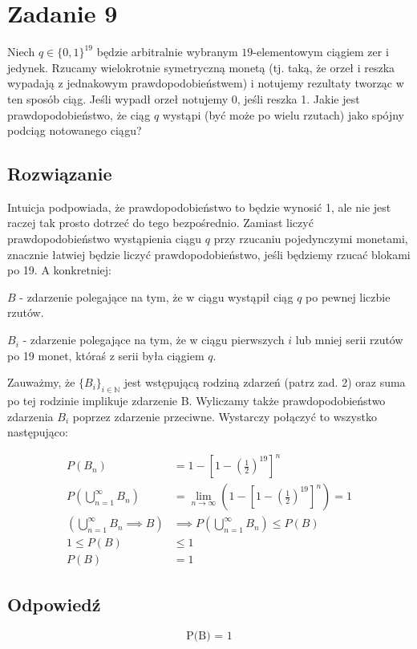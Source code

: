 \section{Zadanie 9}
Niech \(q \in \{0, 1\}^{19}\) będzie arbitralnie wybranym \(19\)-elementowym ciągiem zer i jedynek. Rzucamy wielokrotnie symetryczną monetą (tj. taką, że orzeł i reszka wypadają z jednakowym prawdopodobieństwem) i notujemy rezultaty tworząc w ten sposób ciąg. Jeśli wypadł orzeł notujemy 0, jeśli reszka 1. Jakie jest prawdopodobieństwo, że ciąg \(q\) wystąpi (być może po wielu rzutach) jako spójny podciąg notowanego ciągu?

\subsection*{Rozwiązanie}

Intuicja podpowiada, że prawdopodobieństwo to będzie wynosić 1, ale nie jest raczej tak prosto dotrzeć do tego bezpośrednio. Zamiast liczyć prawdopodobieństwo wystąpienia ciągu \(q\) przy rzucaniu pojedynczymi monetami, znacznie łatwiej będzie liczyć prawdopodobieństwo, jeśli będziemy rzucać blokami po 19. A konkretniej:

\(B\) - zdarzenie polegające na tym, że w ciągu wystąpił ciąg \(q\) po pewnej liczbie rzutów.

\(B_i\) - zdarzenie polegające na tym, że w ciągu pierwszych \(i\) lub mniej serii rzutów po 19 monet, któraś z serii była ciągiem \(q\).

Zauważmy, że \(\{B_i\}_{i\in\mathbb{N}}\) jest wstępującą rodziną zdarzeń (patrz zad. 2) oraz suma po tej rodzinie implikuje zdarzenie B. Wyliczamy także prawdopodobieństwo zdarzenia \(B_i\) poprzez zdarzenie przeciwne. Wystarczy połączyć to wszystko następująco:

\begin{align*}
	P(B_n)                                & = 1 - \left[1 - \left(\frac 1 2\right)^{19}\right]^n                                     \\
	P(\bigcup_{n=1}^\infty B_n)           & = \lim_{n \to \infty}\left(1 - \left[1 - \left(\frac 1 2\right)^{19}\right]^n\right) = 1 \\
	(\bigcup_{n=1}^\infty B_n \implies B) & \implies P(\bigcup_{n=1}^\infty B_n) \leq P(B)                                           \\
	1 \leq P(B)                           & \leq 1                                                                                   \\
	P(B)                                  & = 1
\end{align*}

\subsection*{Odpowiedź}
\[
	\boxed{\text{P(B) = 1}}
\]
